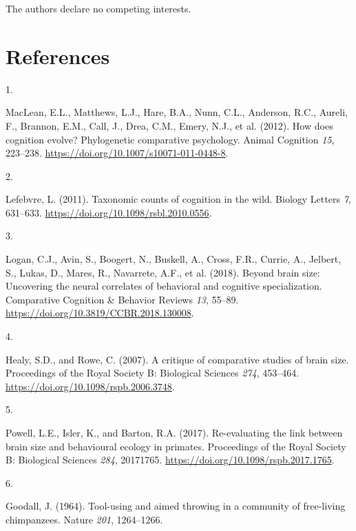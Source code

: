\documentclass[
  man, donotrepeattitle,floatsintext]{apa6}
\newlength{\cslhangindent}
\newlength{\csllabelwidth}
\newlength{\cslentryspacingunit} %
\newenvironment{CSLReferences}[2] %
 {%
  \setlength{\parindent}{0pt}
  \ifodd #1
  \let\oldpar\par
  \def\par{\hangindent=\cslhangindent\oldpar}
  \fi
  \setlength{\parskip}{#2\cslentryspacingunit}
 }%
 {}
\newcommand{\CSLLeftMargin}[1]{\parbox[t]{\csllabelwidth}{#1}}
\newcommand{\CSLRightInline}[1]{\parbox[t]{\linewidth - \csllabelwidth}{#1}\break}
\begin{document}
The authors declare no competing interests.

\newpage

\hypertarget{references}{%
\section{References}\label{references}}

\begingroup

\hypertarget{refs}{}
\begin{CSLReferences}{0}{0}
\leavevmode{}%
\CSLLeftMargin{1. }%
\CSLRightInline{MacLean, E.L., Matthews, L.J., Hare, B.A., Nunn, C.L., Anderson, R.C., Aureli, F., Brannon, E.M., Call, J., Drea, C.M., Emery, N.J., et al. (2012). How does cognition evolve? Phylogenetic comparative psychology. Animal Cognition \emph{15}, 223--238. \url{https://doi.org/10.1007/s10071-011-0448-8}.}

\leavevmode{}%
\CSLLeftMargin{2. }%
\CSLRightInline{Lefebvre, L. (2011). Taxonomic counts of cognition in the wild. Biology Letters \emph{7}, 631--633. \url{https://doi.org/10.1098/rsbl.2010.0556}.}

\leavevmode{}%
\CSLLeftMargin{3. }%
\CSLRightInline{Logan, C.J., Avin, S., Boogert, N., Buskell, A., Cross, F.R., Currie, A., Jelbert, S., Lukas, D., Mares, R., Navarrete, A.F., et al. (2018). Beyond brain size: Uncovering the neural correlates of behavioral and cognitive specialization. Comparative Cognition \& Behavior Reviews \emph{13}, 55--89. \url{https://doi.org/10.3819/CCBR.2018.130008}.}

\leavevmode{}%
\CSLLeftMargin{4. }%
\CSLRightInline{Healy, S.D., and Rowe, C. (2007). A critique of comparative studies of brain size. Proceedings of the Royal Society B: Biological Sciences \emph{274}, 453--464. \url{https://doi.org/10.1098/rspb.2006.3748}.}

\leavevmode{}%
\CSLLeftMargin{5. }%
\CSLRightInline{Powell, L.E., Isler, K., and Barton, R.A. (2017). Re-evaluating the link between brain size and behavioural ecology in primates. Proceedings of the Royal Society B: Biological Sciences \emph{284}, 20171765. \url{https://doi.org/10.1098/rspb.2017.1765}.}

\leavevmode{}%
\CSLLeftMargin{6. }%
\CSLRightInline{Goodall, J. (1964). Tool-using and aimed throwing in a community of free-living chimpanzees. Nature \emph{201}, 1264--1266.}


\end{CSLReferences}
\end{document}
